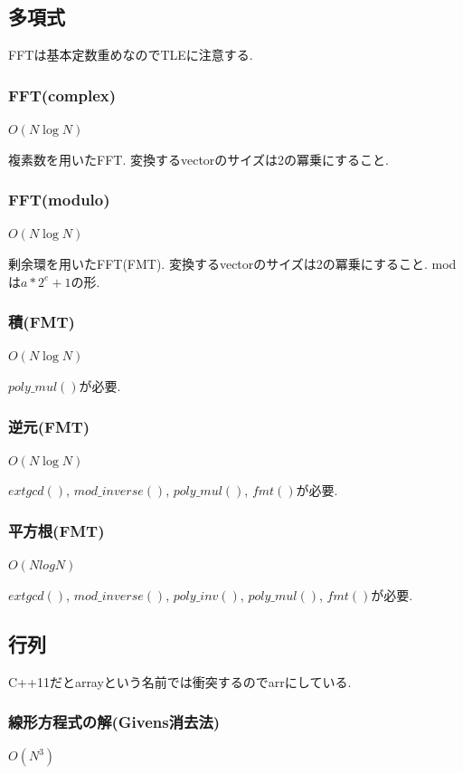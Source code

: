 \documentclass[9pt,twocolumn,a4paper,landscape]{extarticle}
\begin{document}
\subsection{多項式}
FFTは基本定数重めなのでTLEに注意する.
\subsubsection{FFT(complex)}
$O(N \log N)$\par
複素数を用いたFFT. 変換するvectorのサイズは2の冪乗にすること.


\subsubsection{FFT(modulo)}
$O(N \log N)$\par
剰余環を用いたFFT(FMT). 変換するvectorのサイズは2の冪乗にすること. modは$a*2^e+1$の形.\\


\subsubsection{積(FMT)}
$O(N \log N)$\par
$poly\_mul()$が必要.


\subsubsection{逆元(FMT)}
$O(N \log N)$\par
$extgcd()$, $mod\_inverse()$, $poly\_mul()$, $fmt()$が必要.


\subsubsection{平方根(FMT)}
$O(N log N)$\par
$extgcd()$, $mod\_inverse()$, $poly\_inv()$, $poly\_mul()$, $fmt()$が必要.



\subsection{行列}
C++11だとarrayという名前では衝突するのでarrにしている.\par


\subsubsection{線形方程式の解(Givens消去法)}
$O(N^3)$

\end{document}
